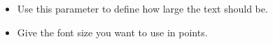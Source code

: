 
\begin{itemize}
\item Use this parameter to define how large the text should be. 
\item Give the font size you want to use in points. 
\end{itemize}
